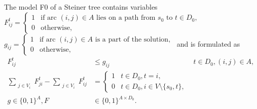 The model F0 of a Steiner tree contains variables
%
\newline\newline
  $F^{t}_{ij}=
\begin{cases}
    1 & \text{if arc $(i,j) \in A$ lies on a path from $s_0$ to $t\in D_0$},\\
    0 & \text{otherwise},
\end{cases}$
\newline\newline
  $g_{ij}=
\begin{cases}
    1 & \text{if arc $(i,j) \in A$ is a part of the solution},\\
    0 & \text{otherwise},
\end{cases}$
\newline\newline
%
and is formulated as
\begin{subequations}
\begin{align}
\label{con:pf1:xfrel} F^{t}_{ij} & \leq g_{ij} & t\in D_0, (i,j)\in A, \\
\label{con:pf1:flow} \sum\limits_{\substack{ j \in V_i }}F^{t}_{ji}-\sum\limits_{\substack{j\in V_i}}F^{t}_{ij} &= 
  \begin{cases}
    1 & t\in D_0, t = i,\\
    0 & t\in D_0, i\in V\setminus \{s_0, t\},
  \end{cases}\\
\label{con:pf1:dim}g \in \{0,1\}^{A},F&\in\{0,1\}^{A \times D_0}.
\end{align}~
\end{subequations}

